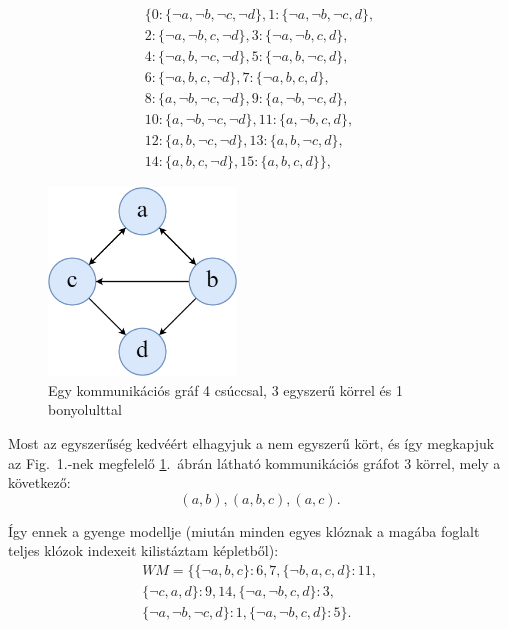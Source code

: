 \documentclass[
]{thesis-ekf}
\theoremstyle{definition}
\theoremstyle{remark}
\begin{document}
	\begin{equation}\label{eq-teljes-klozok}
		\begin{split}
			\{0:\{\neg a,\neg b,\neg c,\neg d\},1:\{\neg a,\neg b,\neg c,d\}, \\
			2:\{\neg a,\neg b,c,\neg d\},3:\{\neg a,\neg b,c,d\}, \\
			4:\{\neg a,b,\neg c,\neg d\},5:\{\neg a,b,\neg c,d\}, \\
			6:\{\neg a,b,c,\neg d\},7:\{\neg a,b,c,d\}, \\
			8:\{a,\neg b,\neg c,\neg d\},9:\{a,\neg b,\neg c,d\}, \\
			10:\{a,\neg b,\neg c,\neg d\},11:\{a,\neg b,c,d\}, \\
			12:\{a,b,\neg c,\neg d\},13:\{a,b,\neg c,d\}, \\
			14:\{a,b,c,\neg d\},15:\{a,b,c,d\}\},
		\end{split}
	\end{equation}
				
	\begin{figure}[!ht]
		\centering
		\includegraphics[width=5cm]{images/SYNASC2020_4node_7edge}
		\caption{Egy kommunikációs gráf 4 csúccsal, 3 egyszerű körrel és 1 bonyolulttal}
		\label{abra-synasc2020-4node7edge}
	\end{figure}

	Most az egyszerűség kedvéért elhagyjuk a nem egyszerű kört, és így megkapjuk az Fig.~1.-nek megfelelő \ref{abra-synasc2020-4node7edge}.~ábrán látható kommunikációs gráfot 3 körrel, mely a következő:
	\[ (a,b),(a,b,c),(a,c). \]
	
	Így ennek a gyenge modellje (miután minden egyes klóznak a magába foglalt teljes klózok indexeit kilistáztam \az{\eqref{eq-teljes-klozok}} képletből):
	\begin{equation*}
		\begin{split}
			WM=\{\{\neg a,b,c\} :6,7,\{\neg b,a,c,d\} :11, \\
			\{\neg c,a,d\} :9,14,\{\neg a,\neg b,c,d\} :3, \\
			\{\neg a,\neg b,\neg c,d\} :1,\{\neg a,\neg b,c,d\} :5\}. \\
		\end{split}
	\end{equation*}
\end{document}
